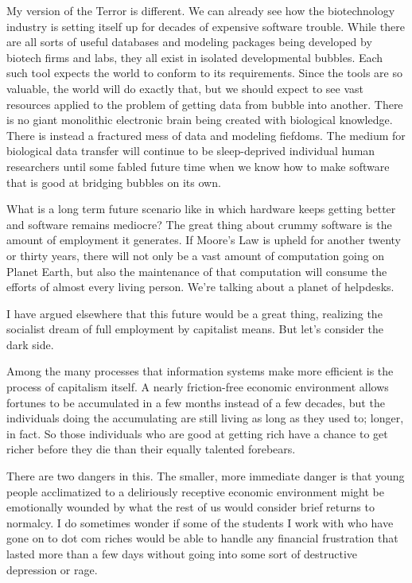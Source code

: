 \documentclass[letterpaper,12pt,english]{sphinxmanual}
\begin{document}
My version of the Terror is different. We can already see how the biotechnology industry is setting itself up for decades of expensive software trouble. While there are all sorts of useful databases and modeling packages being developed by biotech firms and labs, they all exist in isolated developmental bubbles. Each such tool expects the world to conform to its requirements. Since the tools are so valuable, the world will do exactly that, but we should expect to see vast resources applied to the problem of getting data from bubble into another. There is no giant monolithic electronic brain being created with biological knowledge. There is instead a fractured mess of data and modeling fiefdoms. The medium for biological data transfer will continue to be sleep-deprived individual human researchers until some fabled future time when we know how to make software that is good at bridging bubbles on its own.

What is a long term future scenario like in which hardware keeps getting better and software remains mediocre? The great thing about crummy software is the amount of employment it generates. If Moore's Law is upheld for another twenty or thirty years, there will not only be a vast amount of computation going on Planet Earth, but also the maintenance of that computation will consume the efforts of almost every living person. We're talking about a planet of helpdesks.

I have argued elsewhere that this future would be a great thing, realizing the socialist dream of full employment by capitalist means. But let's consider the dark side.

Among the many processes that information systems make more efficient is the process of capitalism itself. A nearly friction-free economic environment allows fortunes to be accumulated in a few months instead of a few decades, but the individuals doing the accumulating are still living as long as they used to; longer, in fact. So those individuals who are good at getting rich have a chance to get richer before they die than their equally talented forebears.

There are two dangers in this. The smaller, more immediate danger is that young people acclimatized to a deliriously receptive economic environment might be emotionally wounded by what the rest of us would consider brief returns to normalcy. I do sometimes wonder if some of the students I work with who have gone on to dot com riches would be able to handle any financial frustration that lasted more than a few days without going into some sort of destructive depression or rage.
\end{document}
